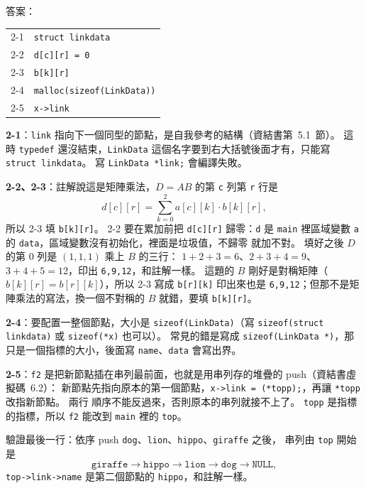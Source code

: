 \begin{pastsoln}
答案：
\begin{center}
\begin{tabular}{ll}
\toprule
2-1 & \texttt{struct linkdata} \\
2-2 & \texttt{d[c][r] = 0} \\
2-3 & \texttt{b[k][r]} \\
2-4 & \texttt{malloc(sizeof(LinkData))} \\
2-5 & \texttt{x->link} \\
\bottomrule
\end{tabular}
\end{center}

\textbf{2-1}：\texttt{link} 指向下一個同型的節點，是自我參考的結構（資結書第~5.1~節）。 這時
\texttt{typedef} 還沒結束，\texttt{LinkData} 這個名字要到右大括號後面才有，只能寫
\texttt{struct linkdata}。 寫 \texttt{LinkData *link;} 會編譯失敗。

\textbf{2-2、2-3}：註解說這是矩陣乘法，$D = AB$ 的第 \texttt{c} 列第 \texttt{r} 行是
\[
d[c][r] = \sum_{k=0}^{2} a[c][k] \cdot b[k][r] ,
\]
所以 2-3 填 \texttt{b[k][r]}。 2-2 要在累加前把 \texttt{d[c][r]} 歸零：\texttt{d} 是
\texttt{main} 裡區域變數 \texttt{a} 的 \texttt{data}，區域變數沒有初始化，裡面是垃圾值，不歸零
就加不對。 填好之後 $D$ 的第 $0$ 列是 $(1, 1, 1)$ 乘上 $B$ 的三行：
$1 + 2 + 3 = 6$、$2 + 3 + 4 = 9$、$3 + 4 + 5 = 12$，印出 \texttt{6,9,12}，和註解一樣。 這題的
$B$ 剛好是對稱矩陣（$b[k][r] = b[r][k]$），所以 2-3 寫成 \texttt{b[r][k]} 印出來也是
\texttt{6,9,12}；但那不是矩陣乘法的寫法，換一個不對稱的 $B$ 就錯，要填 \texttt{b[k][r]}。

\textbf{2-4}：要配置一整個節點，大小是 \texttt{sizeof(LinkData)}（寫
\texttt{sizeof(struct linkdata)} 或 \texttt{sizeof(*x)} 也可以）。 常見的錯是寫成
\texttt{sizeof(LinkData *)}，那只是一個指標的大小，後面寫 \texttt{name}、\texttt{data} 會寫出界。

\textbf{2-5}：\texttt{f2} 是把新節點插在串列最前面，也就是用串列存的堆疊的 push（資結書虛擬碼~6.2）：
新節點先指向原本的第一個節點，\texttt{x->link = (*topp);}，再讓 \texttt{*topp} 改指新節點。 兩行
順序不能反過來，否則原本的串列就接不上了。 \texttt{topp} 是指標的指標，所以 \texttt{f2} 能改到
\texttt{main} 裡的 \texttt{top}。

驗證最後一行：依序 push \texttt{dog}、\texttt{lion}、\texttt{hippo}、\texttt{giraffe} 之後，
串列由 \texttt{top} 開始是
\[
\texttt{giraffe} \to \texttt{hippo} \to \texttt{lion} \to \texttt{dog} \to \texttt{NULL},
\]
\texttt{top->link->name} 是第二個節點的 \texttt{hippo}，和註解一樣。
\end{pastsoln}
